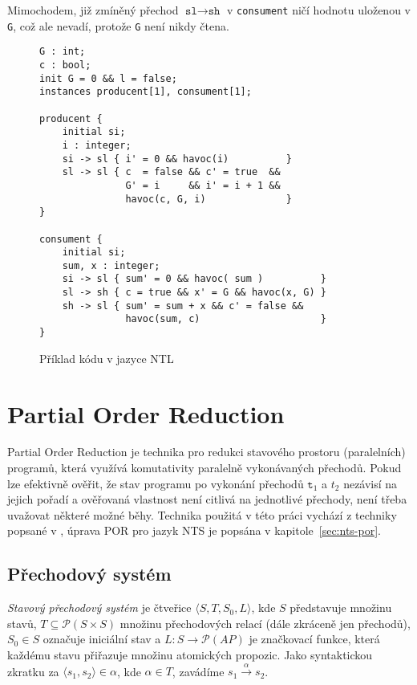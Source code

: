 \documentclass{fithesis2}
\newcommand{\tuple}[1]{\langle #1 \rangle}
\begin{document}
Mimochodem, již zmíněný přechod $\texttt{sl} \rightarrow \texttt{sh}$ v \texttt{consument} ničí hodnotu uloženou v \texttt{G}, což ale nevadí, protože \texttt{G} není nikdy čtena.

\begin{figure}[t]
\begin{lstlisting}
G : int;
c : bool;
init G = 0 && l = false;
instances producent[1], consument[1];

producent {
    initial si;
    i : integer;
    si -> sl { i' = 0 && havoc(i)          }
    sl -> sl { c  = false && c' = true  &&
               G' = i     && i' = i + 1 &&
               havoc(c, G, i)              }
}

consument {
	initial si;
	sum, x : integer;
	si -> sl { sum' = 0 && havoc( sum )          }
	sl -> sh { c = true && x' = G && havoc(x, G) }
	sh -> sl { sum' = sum + x && c' = false &&
	           havoc(sum, c)                     }
}

\end{lstlisting}
\caption{Příklad kódu v jazyce NTL}
\label{fig:nts-prodcons}
\end{figure}

\section{Partial Order Reduction}
\label{sec:POR}
Partial Order Reduction je technika pro redukci stavového prostoru (paralelních) programů, která využívá komutativity paralelně vykonávaných přechodů. Pokud lze efektivně ověřit, že stav programu po vykonání přechodů $\texttt{t}_1$ a $t_2$ nezávisí na jejich pořadí a ověřovaná vlastnost není citlivá na jednotlivé přechody, není třeba uvažovat některé možné běhy. Technika použitá v této práci vychází z techniky popsané v \cite{CLARKE}, úprava POR pro jazyk NTS je popsána v kapitole~\ref{sec:nts-por}.

\subsection{Přechodový systém}
\textit{Stavový přechodový systém} je čtveřice $\tuple{S, T, S_0, L}$, kde $S$ představuje množinu stavů, $T \subseteq \mathcal{P}\left({S \times S}\right)$ množinu přechodových relací (dále zkráceně jen přechodů), $S_0 \in S$ označuje iniciální stav a $L : S \rightarrow \mathcal{P}\left({\mathit{AP}}\right)$ je značkovací funkce, která každému stavu přiřazuje množinu atomických propozic. Jako syntaktickou zkratku za $\tuple{s_1, s_2} \in \alpha$, kde $\alpha \in T$, zavádíme $s_1 \xrightarrow{\alpha} s_2$.
\end{document}
